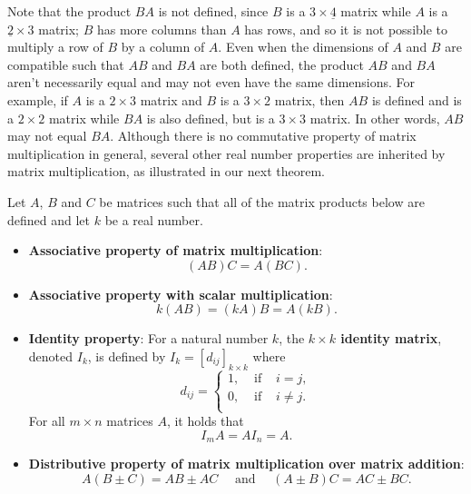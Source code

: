 Note that the product $BA$ is not defined, since $B$ is a $3 \times \underline{4}$ matrix while $A$ is a $\underline{2} \times 3$ matrix;  $B$ has more columns than $A$ has rows, and so it is not possible to multiply a row of $B$ by a column of $A$.  Even when the dimensions of $A$ and $B$ are compatible such that $AB$ and $BA$ are both defined, the product $AB$ and $BA$ aren't necessarily equal and may not even have the same dimensions.  For example, if $A$ is a $2 \times 3$ matrix and $B$ is a $3 \times 2$ matrix, then $AB$ is defined and is a $2 \times 2$ matrix while $BA$ is also defined, but is a $3 \times 3$ matrix. In other words, $AB$ may not equal $BA$. Although there is no commutative property of matrix multiplication in general, several other real number properties are inherited by matrix multiplication, as illustrated in our next theorem.

\smallskip

\begin{theorem}
\label{matrixmultprops}\textbf{}  
Let $A$, $B$ and $C$ be matrices such that all of the matrix products below are defined and let $k$ be a real number.
		
\begin{itemize}
			
	\item  \textbf{Associative property of matrix multiplication}: 
	\[(AB)C = A(BC). \] 
			
	\item  \textbf{Associative property with scalar multiplication}:
	\[k(AB) = (kA)B = A(kB). \]
			
	\item  \textbf{Identity property}: For a natural number $k$, the \textbf{\boldmath $k \times k$ identity matrix}, denoted $I_{k}$, is defined by $I_{k} = \left[d_{ij} \right]_{k \times k}$ where
	\[ d_{ij} = \left\{ \begin{array}{rcl} 1, & \text{ if } & i=j, \\ 0, & \text{ if } & i \neq j. \\ \end{array} \right.\]
	For all $m \times n$ matrices $A$, it holds that
	\[ I_{m}A = AI_{n} = A.\] 
			
	\item  \textbf{Distributive property of matrix multiplication over matrix addition}:   \[A(B \pm C) = AB \pm AC \quad \mbox{ and } \quad (A \pm B)C = AC \pm BC.\]
			
	\end{itemize}

\end{theorem}

